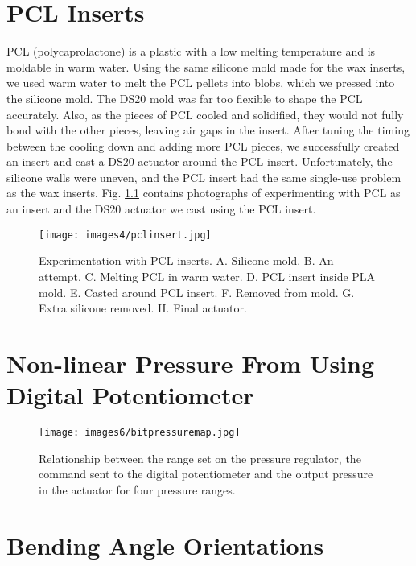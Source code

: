 \appendix

\chapter{PCL Inserts}
\label{appendix:pcl}

PCL (polycaprolactone) is a plastic with a low melting temperature and is moldable in warm water. Using the same silicone mold made for the wax inserts, we used warm water to melt the PCL pellets into blobs, which we pressed into the silicone mold. The DS20 mold was far too flexible to shape the PCL accurately. Also, as the pieces of PCL cooled and solidified, they would not fully bond with the other pieces, leaving air gaps in the insert. After tuning the timing between the cooling down and adding more PCL pieces, we successfully created an insert and cast a DS20 actuator around the PCL insert. Unfortunately, the silicone walls were uneven, and the PCL insert had the same single-use problem as the wax inserts. Fig. \ref{fig:pclinsert} contains photographs of experimenting with PCL as an insert and the DS20 actuator we cast using the PCL insert.

\begin{figure}[!ht]
    \centering
    \texttt{[image: images4/pclinsert.jpg]}
    \caption{Experimentation with PCL inserts. A. Silicone mold. B. An attempt. C. Melting PCL in warm water. D. PCL insert inside PLA mold. E. Casted around PCL insert. F. Removed from mold. G. Extra silicone removed. H. Final actuator.}
    \label{fig:pclinsert}
\end{figure}

\chapter{Non-linear Pressure From Using Digital Potentiometer}
\label{appendix:bitmap}

\begin{figure}[!ht]
    \centering
    \texttt{[image: images6/bitpressuremap.jpg]}
    \caption{Relationship between the range set on the pressure regulator, the command sent to the digital potentiometer and the output pressure in the actuator for four pressure ranges.}
\end{figure}

\chapter{Bending Angle Orientations}
\label{appendix:ao}

